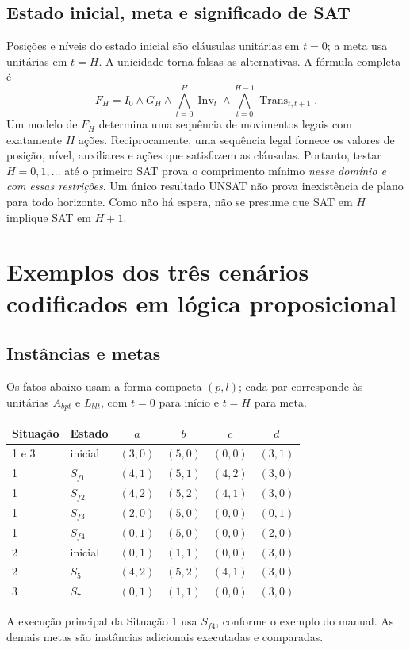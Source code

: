 \documentclass[11pt,a4paper]{article}
\begin{document}
\subsection{Estado inicial, meta e significado de SAT}
Posições e níveis do estado inicial são cláusulas unitárias em $t=0$; a meta usa unitárias em $t=H$. A unicidade torna falsas as alternativas. A fórmula completa é
\[
F_H=I_0\land G_H\land\bigwedge_{t=0}^{H}\operatorname{Inv}_t
\land\bigwedge_{t=0}^{H-1}\operatorname{Trans}_{t,t+1}.
\]
Um modelo de $F_H$ determina uma sequência de movimentos legais com exatamente $H$ ações. Reciprocamente, uma sequência legal fornece os valores de posição, nível, auxiliares e ações que satisfazem as cláusulas. Portanto, testar $H=0,1,\ldots$ até o primeiro SAT prova o comprimento mínimo \emph{nesse domínio e com essas restrições}. Um único resultado UNSAT não prova inexistência de plano para todo horizonte. Como não há espera, não se presume que SAT em $H$ implique SAT em $H+1$.

\section{Exemplos dos três cenários codificados em lógica proposicional}
\subsection{Instâncias e metas}
Os fatos abaixo usam a forma compacta $(p,l)$; cada par corresponde às unitárias $A_{bpt}$ e $L_{blt}$, com $t=0$ para início e $t=H$ para meta.
\begin{center}\small
\begin{tabular}{@{}llcccc@{}}\toprule
Situação & Estado & $a$ & $b$ & $c$ & $d$\\\midrule
1 e 3 & inicial & $(3,0)$ & $(5,0)$ & $(0,0)$ & $(3,1)$\\
1 & $S_{f1}$ & $(4,1)$ & $(5,1)$ & $(4,2)$ & $(3,0)$\\
1 & $S_{f2}$ & $(4,2)$ & $(5,2)$ & $(4,1)$ & $(3,0)$\\
1 & $S_{f3}$ & $(2,0)$ & $(5,0)$ & $(0,0)$ & $(0,1)$\\
1 & $S_{f4}$ & $(0,1)$ & $(5,0)$ & $(0,0)$ & $(2,0)$\\
2 & inicial & $(0,1)$ & $(1,1)$ & $(0,0)$ & $(3,0)$\\
2 & $S_5$ & $(4,2)$ & $(5,2)$ & $(4,1)$ & $(3,0)$\\
3 & $S_7$ & $(0,1)$ & $(1,1)$ & $(0,0)$ & $(3,0)$\\\bottomrule
\end{tabular}
\end{center}
A execução principal da Situação 1 usa $S_{f4}$, conforme o exemplo do manual. As demais metas são instâncias adicionais executadas e comparadas.
\end{document}
